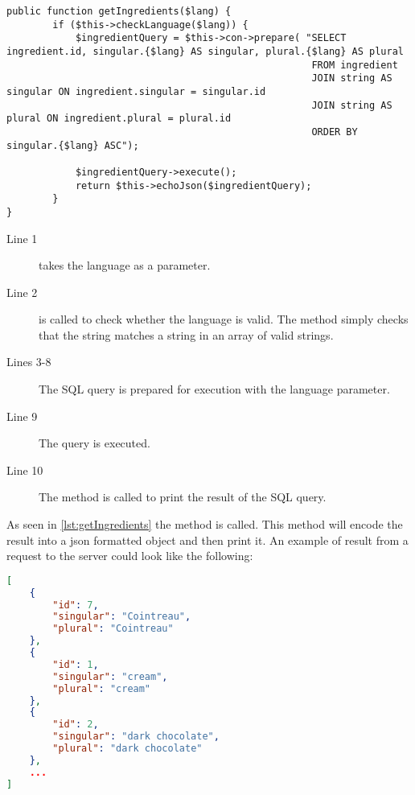 \begin{lstlisting}[language=phpstyle, label=lst:getIngredients, caption=getIngredients() method of DB class]
public function getIngredients($lang) {
        if ($this->checkLanguage($lang)) {
            $ingredientQuery = $this->con->prepare( "SELECT ingredient.id, singular.{$lang} AS singular, plural.{$lang} AS plural
            			                             FROM ingredient
            			                             JOIN string AS singular ON ingredient.singular = singular.id
            			                             JOIN string AS plural ON ingredient.plural = plural.id
                                                     ORDER BY singular.{$lang} ASC");

            $ingredientQuery->execute();
            return $this->echoJson($ingredientQuery);
        }
}
\end{lstlisting}%

\begin{description}
\item[Line 1]  takes the language as a parameter.
\item[Line 2]  is called to check whether the language is valid. The method simply checks that the string matches a string in an array of valid strings.
\item[Lines 3-8] The SQL query is prepared for execution with the language parameter.
\item[Line 9] The query is executed.
\item[Line 10] The  method is called to print the result of the SQL query.
\end{description}

As seen in \autoref{lst:getIngredients} the method  is called. This method will encode the result into a \ac{json} formatted object and then print it. An example of result from a request to the server could look like the following:

\begin{lstlisting}[language=json, label=lst:jsonResult, caption=Example result from \colorbox{background}{getIngredients()}]
[
    {
        "id": 7,
        "singular": "Cointreau",
        "plural": "Cointreau"
    },
    {
        "id": 1,
        "singular": "cream",
        "plural": "cream"
    },
    {
        "id": 2,
        "singular": "dark chocolate",
        "plural": "dark chocolate"
    },
    ...
]
\end{lstlisting}

